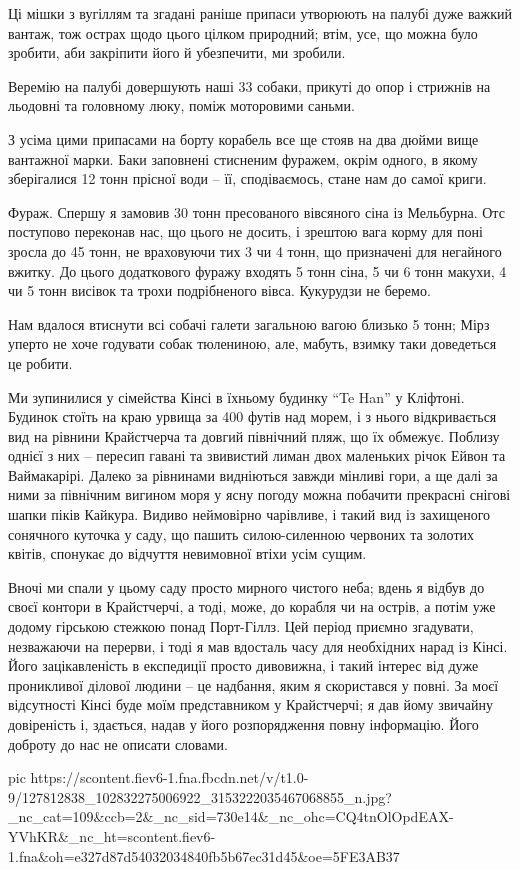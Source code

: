 Ці мішки з вугіллям та згадані раніше припаси утворюють на палубі дуже важкий
вантаж, тож острах щодо цього цілком природний; втім, усе, що можна було
зробити, аби закріпити його й убезпечити, ми зробили.

Веремію на палубі довершують наші 33 собаки, прикуті до опор і стрижнів на
льодовні та головному люку, поміж моторовими саньми.

З усіма цими припасами на борту корабель все ще стояв на два дюйми вище
вантажної марки. Баки заповнені стисненим фуражем, окрім одного, в якому
зберігалися 12 тонн прісної води – її, сподіваємось, стане нам до самої криги.

Фураж. Спершу я замовив 30 тонн пресованого вівсяного сіна із Мельбурна. Отс
поступово переконав нас, що цього не досить, і зрештою вага корму для поні
зросла до 45 тонн, не враховуючи тих 3 чи 4 тонн, що призначені для негайного
вжитку. До цього додаткового фуражу входять 5 тонн сіна, 5 чи 6 тонн макухи, 4
чи 5 тонн висівок та трохи подрібненого вівса. Кукурудзи не беремо.

Нам вдалося втиснути всі собачі галети загальною вагою близько 5 тонн; Мірз
уперто не хоче годувати собак тюлениною, але, мабуть, взимку таки доведеться це
робити.

Ми зупинилися у сімейства Кінсі в їхньому будинку “Te Han” у Кліфтоні. Будинок
стоїть на краю урвища за 400 футів над морем, і з нього відкривається вид на
рівнини Крайстчерча та довгий північний пляж, що їх обмежує. Поблизу однієї з
них – пересип гавані та звивистий лиман двох маленьких річок Ейвон та
Ваймакарірі. Далеко за рівнинами видніються завжди мінливі гори, а ще далі за
ними за північним вигином моря у ясну погоду можна побачити прекрасні снігові
шапки піків Кайкура. Видиво неймовірно чарівливе, і такий вид із захищеного
сонячного куточка у саду, що пашить силою-силенною червоних та золотих квітів,
спонукає до відчуття невимовної втіхи усім сущим. 

Вночі ми спали у цьому саду просто мирного чистого неба; вдень я відбув до
своєї контори в Крайстчерчі, а тоді, може, до корабля чи на острів, а потім уже
додому гірською стежкою понад Порт-Гіллз. Цей період приємно згадувати,
незважаючи на перерви, і тоді я мав вдосталь часу для необхідних нарад із
Кінсі. Його зацікавленість в експедиції просто дивовижна, і такий інтерес від
дуже проникливої ділової людини – це надбання, яким я скористався у повні. За
моєї відсутності Кінсі буде моїм представником у Крайстчерчі; я дав йому
звичайну довіреність і, здається, надав у його розпорядження повну інформацію.
Його доброту до нас не описати словами.

\ifcmt
pic https://scontent.fiev6-1.fna.fbcdn.net/v/t1.0-9/127812838_102832275006922_3153222035467068855_n.jpg?_nc_cat=109&ccb=2&_nc_sid=730e14&_nc_ohc=CQ4tnOlOpdEAX-YVhKR&_nc_ht=scontent.fiev6-1.fna&oh=e327d87d54032034840fb5b67ec31d45&oe=5FE3AB37
\fi


